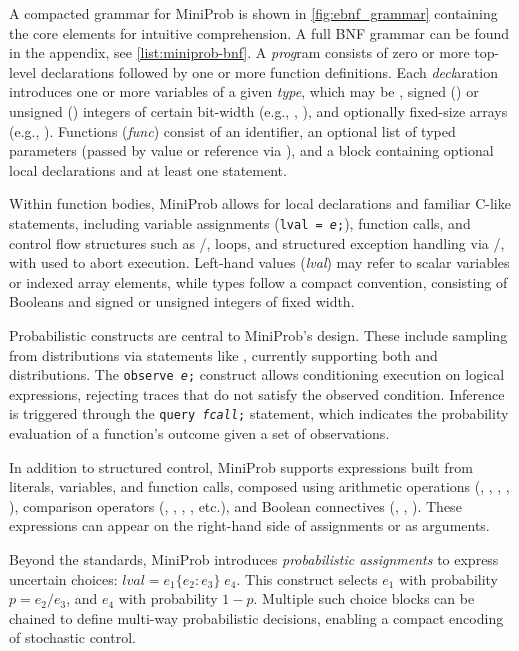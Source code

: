 A compacted grammar for MiniProb is shown in \ref{fig:ebnf_grammar} containing the core elements for intuitive comprehension.
A full BNF grammar can be found in the appendix, see \ref{list:miniprob-bnf}.
A \emph{prog}ram consists of zero or more top-level declarations followed by one or more function definitions. Each \emph{decl}aration introduces one or more variables of a
given \emph{type}, which may be , signed () or unsigned () integers of certain bit-width (e.g., , ),
and optionally fixed-size arrays (e.g., ). Functions (\emph{func}) consist of an identifier, an optional list of typed parameters (passed by value or
reference via \code{&}), and a block containing optional local declarations and at least one statement.

Within function bodies, MiniProb allows for local declarations and familiar C-like statements, including variable assignments (\texttt{lval = \emph{e};}),
function calls, and control flow structures such as /,  loops, and structured exception handling via /,
with  used to abort execution. Left-hand values (\emph{lval}) may refer to scalar variables or indexed array elements, while types follow a compact
convention, consisting of Booleans and signed or unsigned integers of fixed width.

Probabilistic constructs are central to MiniProb's design. These include sampling from distributions via statements like ,
currently supporting both  and  distributions. The \texttt{observe \emph{e};} construct allows conditioning execution on logical expressions,
rejecting traces that do not satisfy the observed condition. Inference is triggered through the \texttt{query \emph{fcall};} statement, which indicates
the probability evaluation of a function's outcome given a set of observations.

In addition to structured control, MiniProb supports expressions built from literals, variables, and function calls, composed using arithmetic
operations (\code{+}, \code{-}, \code{*}, \code{/}, \code{\%}), comparison operators (\code{==}, \code{!=}, \code{<}, \code{<=}, etc.), and Boolean connectives
(\code{!}, \code{&&}, \code{||}). These expressions can appear on the right-hand side of assignments or as arguments.

Beyond the standards, MiniProb introduces \emph{probabilistic assignments} to express uncertain choices: $lval = e_1 \{ e_2 : e_3 \} \; e_4$.
This construct selects $e_1$ with probability $p = e_2 / e_3$, and $e_4$ with probability $1 - p$.
Multiple such choice blocks can be chained to define multi-way probabilistic decisions, enabling a compact encoding of stochastic control.

